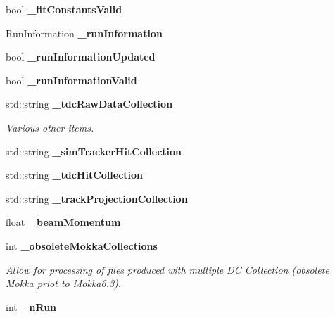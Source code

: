 \begin{DoxyCompactItemize}
\item 
bool {\bfseries \_\-fitConstantsValid}\label{classTBTrackBaseProcessor_a256d8f8408c677dc784b5ebc14a1113e}

\item 
RunInformation {\bfseries \_\-runInformation}\label{classTBTrackBaseProcessor_a0c503bf691e0d9de0ca661ea9f14b811}

\item 
bool {\bfseries \_\-runInformationUpdated}\label{classTBTrackBaseProcessor_a59f417ea32d96a1670591899ce531ce1}

\item 
bool {\bfseries \_\-runInformationValid}\label{classTBTrackBaseProcessor_afe17581672955b7dbb7ec20aa0e6a29f}

\item 
std::string {\bf \_\-tdcRawDataCollection}\label{classTBTrackBaseProcessor_aa8dd92d4d8ad5abb7a00c821bbd6f0fc}

\begin{DoxyCompactList}\small\item\em Various other items. \item\end{DoxyCompactList}\item 
std::string {\bfseries \_\-simTrackerHitCollection}\label{classTBTrackBaseProcessor_a3087addb2e8b059f1ec6851ebf4ad8b8}

\item 
std::string {\bfseries \_\-tdcHitCollection}\label{classTBTrackBaseProcessor_a1f1d2ecaa258f8e7b751a4b6596174af}

\item 
std::string {\bfseries \_\-trackProjectionCollection}\label{classTBTrackBaseProcessor_a9aa2c503f69cba5c793fadd9605e0f18}

\item 
float {\bfseries \_\-beamMomentum}\label{classTBTrackBaseProcessor_a8d2c3a429d01f14154ac44828f415c7f}

\item 
int {\bf \_\-obsoleteMokkaCollections}\label{classTBTrackBaseProcessor_a49e71ebd14a8334e2d322e65586cec4d}

\begin{DoxyCompactList}\small\item\em Allow for processing of files produced with multiple DC Collection (obsolete Mokka priot to Mokka6.3). \item\end{DoxyCompactList}\item 
int {\bfseries \_\-nRun}\label{classTBTrackBaseProcessor_ad7d0e08c632e802779a1d8b645d6c47c}


\end{DoxyCompactItemize}
